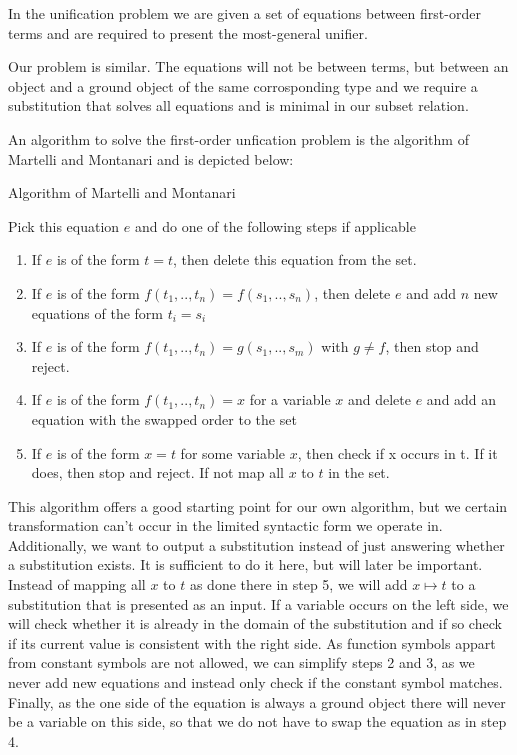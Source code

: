 \documentclass{article}
\begin{document}
        In the unification problem we are given a set of equations between first-order terms and are required to present the most-general unifier.

        Our problem is similar. The equations will not be between terms, but between an object and a ground object of the same corrosponding type and we require a substitution that solves all equations and is minimal in our subset relation.

        An algorithm to solve the first-order unfication problem is the algorithm of Martelli and Montanari \cite{MartMont} and is depicted below:
        \begin{algorithm}
            \caption{Algorithm of Martelli and Montanari}
        \begin{algorithmic}
            \State Pick this equation $e$ and do one of the following steps if applicable
            \begin{enumerate}
                \item If $e$ is of the form $t = t$, then delete this equation from the set.
                \item If $e$ is of the form $f(t_1, .., t_n) = f(s_1,.., s_n)$, then delete $e$ and add $n$ new equations of the form $t_i = s_i$
                \item If $e$ is of the form $f(t_1, .., t_n) = g(s_1,.., s_m)$ with $g \neq f$, then stop and reject.
                \item If $e$ is of the form $f(t_1,..,t_n) = x$ for a variable $x$ and delete $e$ and add an equation with the swapped order to the set
                \item If $e$ is of the form $x=t$ for some variable $x$, then check if x occurs in t. If it does, then stop and reject. If not map all $x$ to $t$ in the set.
            \end{enumerate}
            \EndWhile
        \end{algorithmic}
        \end{algorithm}

        This algorithm offers a good starting point for our own algorithm, but we certain transformation can't occur in the limited syntactic form we operate in. Additionally, we want to output a substitution instead of just answering whether a substitution exists. It is sufficient to do it here, but will later be important. Instead of mapping all $x$ to $t$ as done there in step 5, we will add $x\mapsto t$ to a substitution that is presented as an input. If a variable occurs on the left side, we will check whether it is already in the domain of the substitution and if so check if its current value is consistent with the right side.
        As function symbols appart from constant symbols are not allowed, we can simplify steps 2 and 3, as we never add new equations and instead only check if the constant symbol matches. Finally, as the one side of the equation is always a ground object there will never be a variable on this side, so that we do not have to swap the equation as in step 4.
\end{document}
